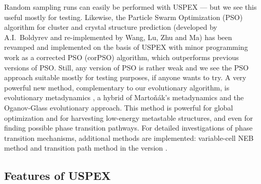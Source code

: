 \documentclass[12pt]{article}
\begin{document}
Random sampling runs can easily be performed with USPEX --- but we see this
useful mostly for testing. Likewise, the Particle Swarm Optimization (PSO)
algorithm for cluster and crystal structure prediction (developed by
A.I.~Boldyrev and re-implemented by Wang, Lu, Zhu and Ma) has been revamped and
implemented on the basis of USPEX with minor programming work as a corrected PSO
(corPSO) algorithm, which outperforms previous versions of PSO. Still, any
version of PSO is rather weak and we see the PSO approach suitable mostly for
testing purposes, if anyone wants to try. A very powerful new method,
complementary to our evolutionary algorithm, is evolutionary metadynamics
\cite{Lyakhov2013}, a hybrid of Marto\v{n}\'{a}k's metadynamics and the
Oganov-Glass evolutionary approach. This method is powerful for global
optimization and for harvesting low-energy metastable structures, and even for
finding possible phase transition pathways. For detailed investigations of phase
transition mechanisms, additional methods are implemented: variable-cell NEB
method \cite{Qian2013} and transition path method \cite{Dellago1998} in the
version \cite{Boulfelfel2012}.

\subsection{Features of USPEX}
\end{document}
